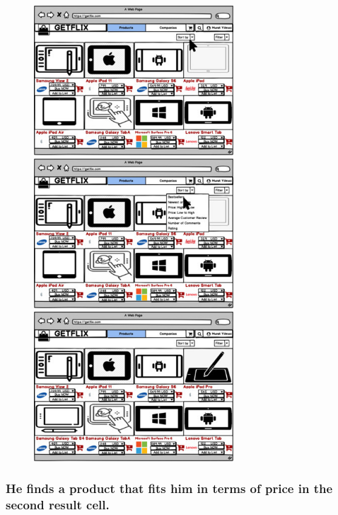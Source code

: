 \documentclass[]{article}
\begin{document}
\begin{figure}[H]
    \centering
    \includegraphics[height=2.2in]{./images/44.jpg}
    \includegraphics[height=2.2in]{./images/45.jpg}
    \includegraphics[height=2.2in]{./images/46.jpg}

\end{figure}

\hypertarget{he-finds-a-product-that-fits-him-in-terms-of-price-in-the-second-result-cell.}{%
    \subsubsection{He finds a product that fits him in terms of price in the
        second result
        cell.}\label{he-finds-a-product-that-fits-him-in-terms-of-price-in-the-second-result-cell.}}
\end{document}
